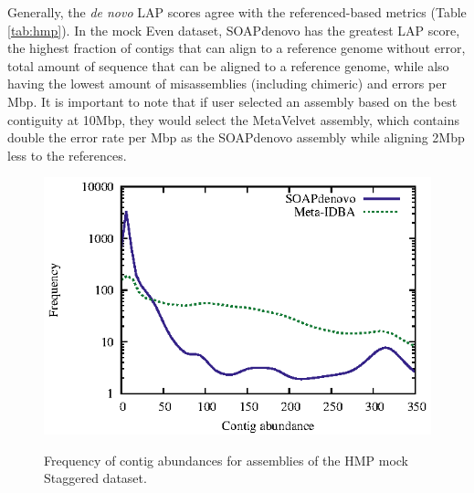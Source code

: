 \documentclass[12pt,\mydriver]{thesis}
\begin{document}
Generally, the \emph{de novo} LAP scores agree with the referenced-based metrics (Table \ref{tab:hmp}).
In the mock Even dataset, SOAPdenovo has the greatest LAP score, the highest fraction of contigs that can align to a reference genome without error, total amount of sequence that can be aligned to a reference genome, while also having the lowest amount of misassemblies (including chimeric) and errors per Mbp.
It is important to note that if user selected an assembly based on the best contiguity at 10Mbp, they would select the MetaVelvet assembly, which contains double the error rate per Mbp as the SOAPdenovo assembly while aligning 2Mbp less to the references.

\begin{figure}[tb!]
\begin{center}
\includegraphics[width=.8\textwidth]{coverage}
\end{center}
\renewcommand{\baselinestretch}{1}
\small\normalsize
\begin{quote}
\caption[Frequency of contig abundances for assemblies of the HMP mock Staggered dataset]{Frequency of contig abundances for assemblies of the HMP mock Staggered dataset.}
\label{fig:coverage}
\end{quote}
\end{figure}
\renewcommand{\baselinestretch}{2}
\small\normalsize
\end{document}
